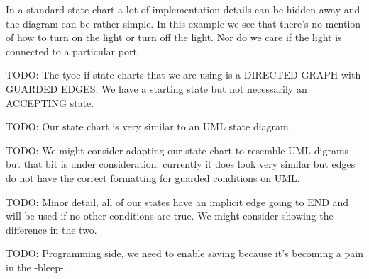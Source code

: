 In a standard state chart a lot of implementation details can be hidden away and the diagram can be rather simple. In this example we see that there's no mention of how to turn on the light or turn off the light. Nor do we care if the light is connected to a particular port.

TODO: The tyoe if state charts that we are using is a DIRECTED GRAPH with GUARDED EDGES. We have a starting state but not necessarily an ACCEPTING state.

TODO: Our state chart is very similar to an UML state diagram.

TODO: We might consider adapting our state chart to resemble UML digrams but that bit is under consideration. currently it does look very similar but edges do not have the correct formatting for guarded conditions on UML.

TODO: Minor detail, all of our states have an implicit edge going to END and will be used if no other conditions are true. We might consider showing the difference in the two.

TODO: Programming side, we need to enable saving because it's becoming a pain in the -bleep-.
